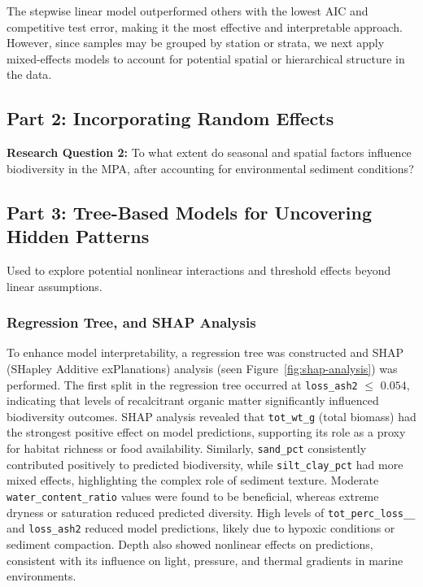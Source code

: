 \documentclass[12pt]{article}
\begin{document}
\qquad The stepwise linear model outperformed others with the lowest AIC and competitive test error, making it the most effective and interpretable approach. However, since samples may be grouped by station or strata, we next apply mixed-effects models to account for potential spatial or hierarchical structure in the data.

\subsection{Part 2: Incorporating Random Effects}

\textbf{Research Question 2: } To what extent do seasonal and spatial factors
influence biodiversity in the MPA, after accounting for environmental sediment
conditions?



\subsection{Part 3:  Tree-Based Models for Uncovering Hidden Patterns}

\qquad Used to explore potential nonlinear interactions and threshold effects
beyond linear assumptions.

\subsubsection{Regression Tree, and SHAP Analysis}

\qquad To enhance model interpretability, a regression tree was constructed and
SHAP (SHapley Additive exPlanations) analysis (seen
Figure~\ref{fig:shap-analysis}) was performed. The first split in the regression
tree occurred at \texttt{loss\_ash2} $\leq$ $0.054$, indicating that levels of
recalcitrant organic matter significantly influenced biodiversity outcomes. SHAP
analysis revealed that \texttt{tot\_wt\_g} (total biomass) had the strongest
positive effect on model predictions, supporting its role as a proxy for habitat
richness or food availability. Similarly, \texttt{sand\_pct} consistently
contributed positively to predicted biodiversity, while \texttt{silt\_clay\_pct}
had more mixed effects, highlighting the complex role of sediment texture.
Moderate \texttt{water\_content\_ratio} values were found to be beneficial,
whereas extreme dryness or saturation reduced predicted diversity. High levels
of \texttt{tot\_perc\_loss\_\_} and \texttt{loss\_ash2} reduced model
predictions, likely due to hypoxic conditions or sediment compaction. Depth also
showed nonlinear effects on predictions, consistent with its influence on light,
pressure, and thermal gradients in marine environments.
\end{document}
